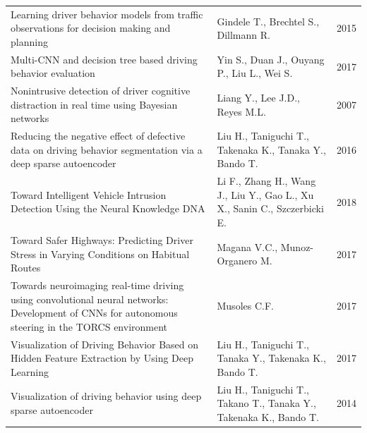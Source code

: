 \documentclass[10pt,journal,compsoc]{IEEEtran}
\begin{document}
\begin{landscape}
\begin{table}[!t]
\begin{tabular}{p{12cm}ll}
Learning driver behavior models from traffic observations for decision making and planning                                                       & Gindele T., Brechtel S., Dillmann R.                                         & 2015                             \\
Multi-CNN and decision tree based driving behavior evaluation                                                                                    & Yin S., Duan J., Ouyang P., Liu L., Wei S.                                   & 2017                             \\
Nonintrusive detection of driver cognitive distraction in real time using Bayesian networks                                                      & Liang Y., Lee J.D., Reyes M.L.                                               & 2007                             \\
Reducing the negative effect of defective data on driving behavior segmentation via a deep sparse autoencoder                                    & Liu H., Taniguchi T., Takenaka K., Tanaka Y., Bando T.                       & 2016                             \\
Toward Intelligent Vehicle Intrusion Detection Using the Neural Knowledge DNA                                                                    & Li F., Zhang H., Wang J., Liu Y., Gao L., Xu X., Sanin C., Szczerbicki E.    & 2018                             \\
Toward Safer Highways: Predicting Driver Stress in Varying Conditions on Habitual Routes                                                         & Magana V.C., Munoz-Organero M.                                               & 2017                             \\
Towards neuroimaging real-time driving using convolutional neural networks: Development of CNNs for autonomous steering in the TORCS environment & Musoles C.F.                                                                 & 2017                             \\
Visualization of Driving Behavior Based on Hidden Feature Extraction by Using Deep Learning                                                      & Liu H., Taniguchi T., Tanaka Y., Takenaka K., Bando T.                       & 2017                             \\
Visualization of driving behavior using deep sparse autoencoder                                                                                  & Liu H., Taniguchi T., Takano T., Tanaka Y., Takenaka K., Bando T.            & 2014                            
\end{tabular}
\end{table}
\end{landscape}
\end{document}
